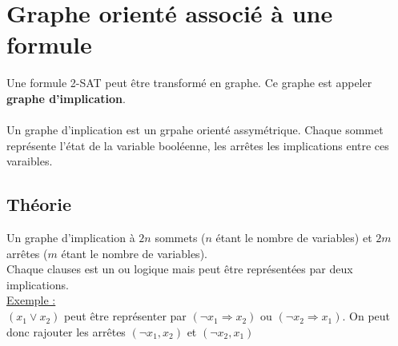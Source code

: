 \documentclass{article}
\begin{document}
    \section{Graphe orienté associé à une formule}
    Une formule 2-SAT peut être transformé en graphe. Ce graphe est appeler \textbf{graphe d'implication}. \\
    \\
    Un graphe d'inplication est un grpahe orienté assymétrique. Chaque sommet représente l'état de la variable booléenne, les arrêtes les implications entre ces varaibles.
    \subsection{Théorie}
    Un graphe d'implication à $2n$ sommets ($n$ étant le nombre de variables) et $2m$ arrêtes ($m$ étant le nombre de variables). \\
    Chaque clauses est un ou logique mais peut être représentées par deux implications. \\
    \underline{Exemple : } \\
    $(x_1 \lor x_2)$ peut être représenter par $(\neg x_1 \Longrightarrow x_2)$ ou $(\neg x_2 \Longrightarrow x_1)$. On peut donc rajouter les arrêtes $(\neg x_1, x_2)$ et $(\neg x_2, x_1)$    
    \newpage
\end{document}
